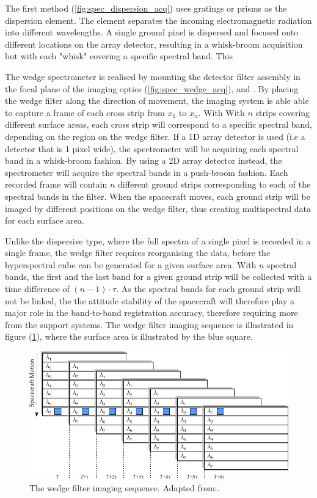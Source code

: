 The first method (\ref{fig:spec_dispersion_acq}) uses gratings or prisms as the dispersion element. The element separates the incoming electromagnetic radiation into different wavelengths. A single ground pixel is dispersed and focused onto different locations on the array detector\cite{nieke1997a}, resulting in a whisk-broom acquisition but with each "whisk" covering a specific spectral band. This

The wedge spectrometer is realised by mounting the detector filter assembly in the focal plane of the imaging optics (\ref{fig:spec_wedge_acq}), \cite{joseph2015building} and \cite{nieke1997a}. By placing the wedge filter along the direction of movement, the imaging system is able able to capture a frame of each cross strip from $x_1$ to $x_n$. With With $n$ strips covering different surface areas, each cross strip will correspond to a specific spectral band, depending on the region on the wedge filter. If a 1D array detector is used (i.e a detector that is 1 pixel wide), the spectrometer will be acquiring each spectral band in a whisk-broom fashion. By using a 2D array detector instead, the spectrometer will acquire the spectral bands in a push-broom fashion. Each recorded frame will contain $n$ different ground strips corresponding to each of the spectral bands in the filter. When the spacecraft moves, each ground strip will be imaged by different positions on the wedge filter, thus creating multispectral data for each surface area.

Unlike the dispersive type, where the full spectra of a single pixel is recorded in a single frame, the wedge filter requires reorganising the data, before the hyperspectral cube can be generated for a given surface area. With $n$ spectral bands, the first and the last band for a given ground strip will be collected with a time difference of $(n-1)\cdot \tau$. As the spectral bands for each ground strip will not be linked, the the attitude stability of the spacecraft will therefore play a major role in the band-to-band registration accuracy\cite{joseph2015building}, therefore requiring more from the support systems. The wedge filter imaging sequence is illustrated in figure (\ref{fig:wedge_filt_img_sequence}), where the surface area is illustrated by the blue square.
\begin{figure}[htb]
\centering
\includegraphics[width=\textwidth]{figures/Orbiter/wedge_filt_img_sequence.pdf}
\caption{The wedge filter imaging sequence. Adapted from:\cite{joseph2015building}.}
\label{fig:wedge_filt_img_sequence}
\end{figure}

